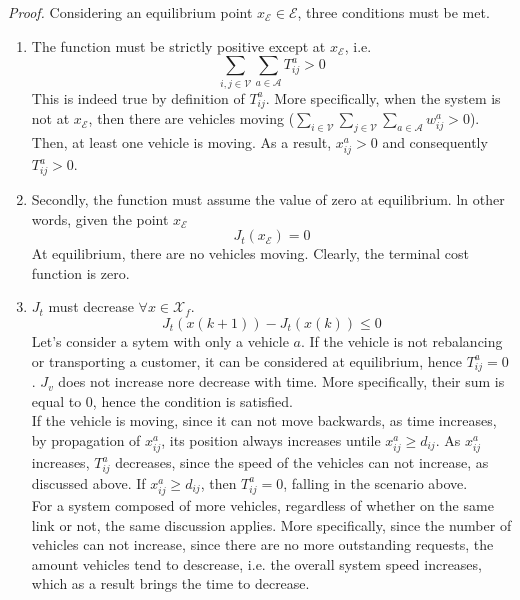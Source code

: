 \textit{Proof. } Considering an equilibrium point $x_{\mathcal{E}}\in\mathcal{E}$, three conditions must be met.\\
\begin{enumerate}
	\item The function must be strictly positive except at $x_{\mathcal{E}}$, i.e.
	\begin{equation*}
		\sum_{i,j \in \mathcal{V}}\sum_{a \in\mathcal{A}}T_{ij}^a >0
	\end{equation*}
	This is indeed true by definition of $T_{ij}^a$. More specifically, when the system is not at $x_{\mathcal{E}}$, then there are vehicles moving ($\sum_{i \in \mathcal{V}}\sum_{j \in \mathcal{V}}\sum_{a \in\mathcal{A}}w_{ij}^a >0$). Then, at least one vehicle is moving. As a result, $x_{ij}^a >0$ and consequently $T_{ij}^a>0$. \\
	\item Secondly, the function must assume the value of zero at equilibrium. ln other words, given the point $x_{\mathcal{E}}$
	\begin{equation*}
		J_t(x_{\mathcal{E}}) = 0
	\end{equation*}
	At equilibrium, there are no vehicles moving. Clearly, the terminal cost function is zero. 
	\item $J_t$ must decrease $\forall x \in \mathcal{X}_f$. 
	\begin{equation*}
		J_t(x(k+1)) - J_t(x(k))\leq 0
	\end{equation*}
	Let's consider a sytem with only a vehicle $a$. If the vehicle is not rebalancing or transporting a customer, it can be considered at equilibrium, hence $T^a_{ij} = 0$. $J_v$ does not increase nore decrease with time. More specifically, their sum is equal to 0, hence the condition is satisfied. \\
	If the vehicle is moving, since it can not move backwards, as time increases, by propagation of $x_{ij}^a$, its position always increases untile $x_{ij}^a \ge d_{ij}$. As $x_{ij}^a$ increases, $T_{ij}^a$ decreases, since the speed of the vehicles can not increase, as discussed above. If $x_{ij}^a \ge d_{ij}$, then $T_{ij}^a=0$, falling in the scenario above.\\
	For a system composed of more vehicles, regardless of whether on the same link or not, the same discussion applies. More specifically, since the number of vehicles can not increase, since there are no more outstanding requests, the amount vehicles tend to descrease, i.e. the overall system speed increases, which as a result brings the time to decrease. 
	
	
\end{enumerate}


